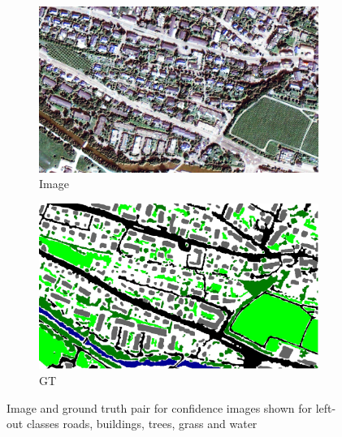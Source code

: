 \documentclass[10pt]{article}
\begin{document}
\begin{figure}[H]
	\centering
	\begin{subfigure}{.42\textwidth}
		\includegraphics[width=\textwidth]{Im_18}
		\caption{Image}
	\end{subfigure}
	\begin{subfigure}{.42\textwidth}
		\includegraphics[width=\textwidth]{GT_18}
		\caption{\acrlong{GT}}
	\end{subfigure}
	\caption{Image and ground truth pair for confidence images shown for left-out classes roads, buildings, trees, grass and water}
\end{figure}
\end{document}
